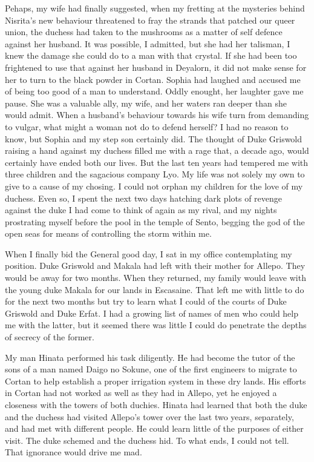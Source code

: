 \documentclass{article}
\begin{document}
Pehaps, my wife had finally suggested, when my fretting at the mysteries behind Nisrita's new behaviour threatened to fray the strands that patched our queer union, the duchess had taken to the mushrooms as a matter of self defence against her husband. It was possible, I admitted, but she had her talisman, I knew the damage she could do to a man with that crystal. If she had been too frightened to use that against her husband in Deyalorn, it did not make sense for her to turn to the black powder in Cortan. Sophia had laughed and accused me of being too good of a man to understand. Oddly enought, her laughter gave me pause. She was a valuable ally, my wife, and her waters ran deeper than she would admit. When a husband's behaviour towards his wife turn from demanding to vulgar, what might a woman not do to defend herself? I had no reason to know, but Sophia and my step son certainly did. The thought of Duke Griswold raising a hand against my duchess filled me with a rage that, a decade ago, would certainly have ended both our lives. But the last ten years had tempered me with three children and the sagacious company Lyo. My life was not solely my own to give to a cause of my chosing. I could not orphan my children for the love of my duchess. Even so, I spent the next two days hatching dark plots of revenge against the duke I had come to think of again as my rival, and my nights prostrating myself before the pool in the temple of Sento, begging the god of the open seas for means of controlling the storm within me.

When I finally bid the General good day, I sat in my office contemplating my position. Duke Griswold and Makala had left with their mother for Allepo. They would be away for two months. When they returned, my family would leave with the young duke Makala for our lands in Escasaine. That left me with little to do for the next two months but try to learn what I could of the courts of Duke Griswold and Duke Erfat. I had a growing list of names of men who could help me with the latter, but it seemed there was little I could do penetrate the depths of secrecy of the former. 

My man Hinata performed his task diligently. He had become the tutor of the sons of a man named Daigo no Sokune, one of the first engineers to migrate to Cortan to help establish a proper irrigation system in these dry lands. His efforts in Cortan had not worked as well as they had in Allepo, yet he enjoyed a closeness with the towers of both duchies. Hinata had learned that both the duke and the duchess had visited Allepo's tower over the last two years, separately, and had met with different people. He could learn little of the purposes of either visit. The duke schemed and the duchess hid. To what ends, I could not tell. That ignorance would drive me mad. 
\end{document}
